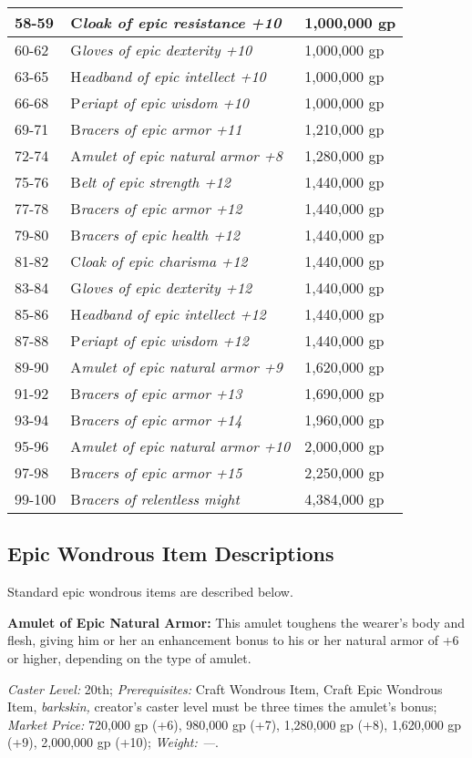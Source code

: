 \documentclass{article}
\begin{document}
\begin{tabular}{|>{\raggedright}p{28pt}|>{\raggedright}p{135pt}|>{\raggedright}p{55pt}|}
\hline
58-59 & C\textit{loak of epic resistance +10 } & 1,000,000 gp \tabularnewline
\hline
60-62 & G\textit{loves of epic dexterity +10 } & 1,000,000 gp \tabularnewline
\hline
63-65 & H\textit{eadband of epic intellect +10 } & 1,000,000 gp \tabularnewline
\hline
66-68 & P\textit{eriapt of epic wisdom +10 } & 1,000,000 gp \tabularnewline
\hline
69-71 & B\textit{racers of epic armor +11 } & 1,210,000 gp \tabularnewline
\hline
72-74 & A\textit{mulet of epic natural armor +8 } & 1,280,000 gp \tabularnewline
\hline
75-76 & B\textit{elt of epic strength +12 } & 1,440,000 gp \tabularnewline
\hline
77-78 & B\textit{racers of epic armor +12 } & 1,440,000 gp \tabularnewline
\hline
79-80 & B\textit{racers of epic health +12 } & 1,440,000 gp \tabularnewline
\hline
81-82 & C\textit{loak of epic charisma +12 } & 1,440,000 gp \tabularnewline
\hline
83-84 & G\textit{loves of epic dexterity +12 } & 1,440,000 gp \tabularnewline
\hline
85-86 & H\textit{eadband of epic intellect +12 } & 1,440,000 gp \tabularnewline
\hline
87-88 & P\textit{eriapt of epic wisdom +12 } & 1,440,000 gp \tabularnewline
\hline
89-90 & A\textit{mulet of epic natural armor +9 } & 1,620,000 gp \tabularnewline
\hline
91-92 & B\textit{racers of epic armor +13 } & 1,690,000 gp \tabularnewline
\hline
93-94 & B\textit{racers of epic armor +14 } & 1,960,000 gp \tabularnewline
\hline
95-96 & A\textit{mulet of epic natural armor +10 } & 2,000,000 gp \tabularnewline
\hline
97-98 & B\textit{racers of epic armor +15 } & 2,250,000 gp \tabularnewline
\hline
99-100 & B\textit{racers of relentless might } & 4,384,000 gp \tabularnewline
\hline
\end{tabular}

\vspace{12pt}
\subsection*{Epic Wondrous Item Descriptions }

Standard epic wondrous items are described below. 

\vspace{12pt}
\textbf{Amulet of Epic Natural Armor:  }This amulet toughens the wearer's body 
and flesh, giving him or her an enhancement bonus to his or her natural armor of 
+6 or higher, depending on the type of amulet. 

\textit{Caster Level: }20th; \textit{Prerequisites: }Craft Wondrous Item, Craft 
Epic Wondrous Item, \textit{barkskin, }creator's caster level must be three times 
the amulet's bonus; \textit{Market Price: }720,000 gp (+6), 980,000 gp (+7), 1,280,000 
gp (+8), 1,620,000 gp (+9), 2,000,000 gp (+10); \textit{Weight: ---}. 
\end{document}
